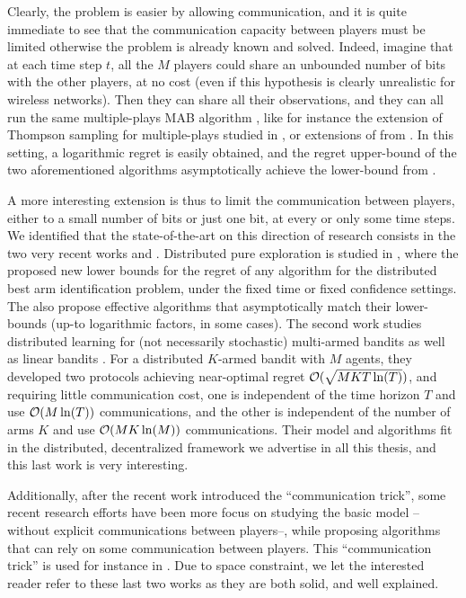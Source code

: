 Clearly, the problem is easier by allowing communication, and it is quite immediate to see that the communication capacity between players must be limited otherwise the problem is already known and solved.
Indeed, imagine that at each time step $t$, all the $M$ players could share an unbounded number of bits with the other players, at no cost (even if this hypothesis is clearly unrealistic for wireless networks).
Then they can share all their observations, and they can all run the same multiple-plays MAB algorithm \cite{Anantharam87a}, like for instance the extension of Thompson sampling for multiple-plays studied in \cite{Komiyama15}, or extensions of \KLUCB{} from \cite{Luedtke16}.
In this setting, a logarithmic regret is easily obtained, and the regret upper-bound of the two aforementioned algorithms asymptotically achieve the lower-bound from \cite{Anantharam87a}.

A more interesting extension is thus to limit the communication between players, either to a small number of bits or just one bit, at every or only some time steps.
We identified that the state-of-the-art on this direction of research consists in the two very recent works
\cite{tao2019collaborative} and \cite{wang2019distributed}.
Distributed pure exploration is studied in \cite{tao2019collaborative}, where the proposed new lower bounds for the regret of any algorithm for the distributed best arm identification problem, under the fixed time or fixed confidence settings.
The also propose effective algorithms that asymptotically match their lower-bounds (up-to logarithmic factors, in some cases).
The second work studies distributed learning for (not necessarily stochastic) multi-armed bandits as well as linear bandits \cite{tao2019collaborative}.
For a distributed $K$-armed bandit with $M$ agents, they developed two protocols achieving near-optimal regret $\mathcal{O}(\sqrt{M K T \ln(T)})$,
and requiring little communication cost,
one is independent of the time horizon $T$ and use $\mathcal{O}(M \ln(T))$ communications,
and the other is independent of the number of arms $K$ and use $\mathcal{O}(M K \ln(M))$ communications.
Their model and algorithms fit in the distributed, decentralized framework we advertise in all this thesis, and this last work is very interesting.

Additionally, after the recent work \cite{BoursierPerchet18} introduced the ``communication trick'',
some recent research efforts have been more focus on studying the basic model --without explicit communications between players--, while proposing algorithms that can rely on some communication between players.
This ``communication trick'' is used for instance in \cite{KaufmannAbbas19}.
Due to space constraint, we let the interested reader refer to these last two works \cite{BoursierPerchet18,KaufmannAbbas19} as they are both solid, and well explained.

